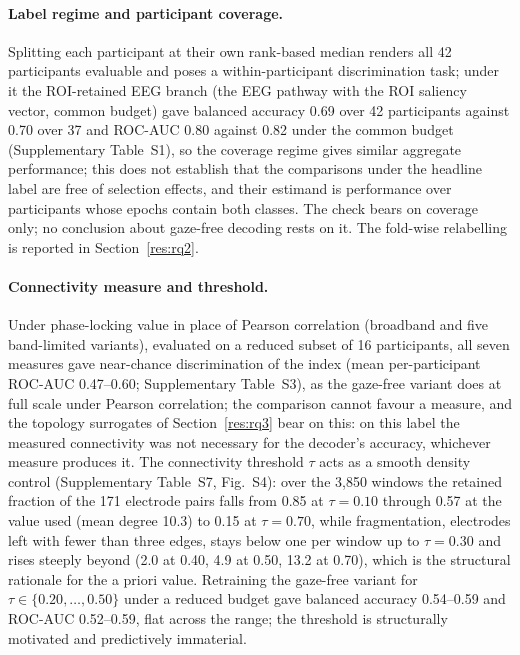 \paragraph{Label regime and participant coverage.} Splitting each participant at their own rank-based median renders all 42 participants evaluable and poses a within-participant discrimination task; under it the ROI-retained EEG branch (the EEG pathway with the ROI saliency vector, common budget) gave balanced accuracy 0.69 over 42 participants against 0.70 over 37 and ROC-AUC 0.80 against 0.82 under the common budget (Supplementary Table~S1), so the coverage regime gives similar aggregate performance; this does not establish that the comparisons under the headline label are free of selection effects, and their estimand is performance over participants whose epochs contain both classes. The check bears on coverage only; no conclusion about gaze-free decoding rests on it. The fold-wise relabelling is reported in Section~\ref{res:rq2}.

\paragraph{Connectivity measure and threshold.} Under phase-locking value in place of Pearson correlation (broadband and five band-limited variants), evaluated on a reduced subset of 16 participants, all seven measures gave near-chance discrimination of the index (mean per-participant ROC-AUC 0.47--0.60; Supplementary Table~S3), as the gaze-free variant does at full scale under Pearson correlation; the comparison cannot favour a measure, and the topology surrogates of Section~\ref{res:rq3} bear on this: on this label the measured connectivity was not necessary for the decoder's accuracy, whichever measure produces it. The connectivity threshold $\tau$ acts as a smooth density control (Supplementary Table~S7, Fig.~S4): over the 3{,}850 windows the retained fraction of the 171 electrode pairs falls from 0.85 at $\tau=0.10$ through 0.57 at the value used (mean degree 10.3) to 0.15 at $\tau=0.70$, while fragmentation, electrodes left with fewer than three edges, stays below one per window up to $\tau=0.30$ and rises steeply beyond (2.0 at 0.40, 4.9 at 0.50, 13.2 at 0.70), which is the structural rationale for the a priori value. Retraining the gaze-free variant for $\tau\in\{0.20,\dots,0.50\}$ under a reduced budget gave balanced accuracy 0.54--0.59 and ROC-AUC 0.52--0.59, flat across the range; the threshold is structurally motivated and predictively immaterial.

